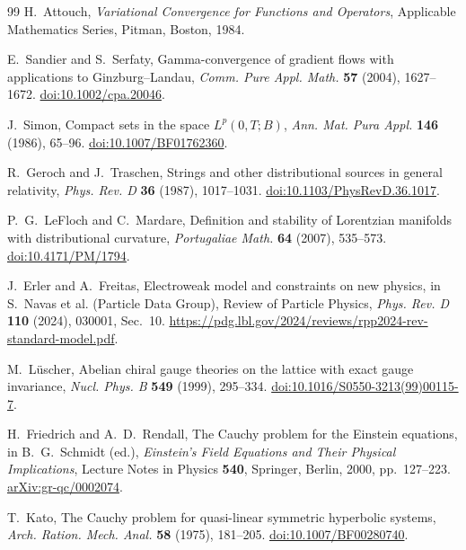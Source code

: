 \documentclass[11pt]{article}
\numberwithin{equation}{section}
\theoremstyle{definition}
\theoremstyle{remark}
\begin{document}
\begin{thebibliography}{99}
H.~Attouch,
\emph{Variational Convergence for Functions and Operators},
Applicable Mathematics Series, Pitman, Boston, 1984.

E.~Sandier and S.~Serfaty,
Gamma-convergence of gradient flows with applications to Ginzburg--Landau,
\emph{Comm. Pure Appl. Math.} \textbf{57} (2004), 1627--1672.
\href{https://doi.org/10.1002/cpa.20046}{doi:10.1002/cpa.20046}.

J.~Simon,
Compact sets in the space $L^p(0,T;B)$,
\emph{Ann. Mat. Pura Appl.} \textbf{146} (1986), 65--96.
\href{https://doi.org/10.1007/BF01762360}{doi:10.1007/BF01762360}.

R.~Geroch and J.~Traschen,
Strings and other distributional sources in general relativity,
\emph{Phys. Rev. D} \textbf{36} (1987), 1017--1031.
\href{https://doi.org/10.1103/PhysRevD.36.1017}{doi:10.1103/PhysRevD.36.1017}.

P.~G.~LeFloch and C.~Mardare,
Definition and stability of Lorentzian manifolds with distributional curvature,
\emph{Portugaliae Math.} \textbf{64} (2007), 535--573.
\href{https://doi.org/10.4171/PM/1794}{doi:10.4171/PM/1794}.

J.~Erler and A.~Freitas,
Electroweak model and constraints on new physics,
in S.~Navas et al. (Particle Data Group), Review of Particle Physics,
\emph{Phys. Rev. D} \textbf{110} (2024), 030001, Sec.~10.
\url{https://pdg.lbl.gov/2024/reviews/rpp2024-rev-standard-model.pdf}.

M.~L\"uscher,
Abelian chiral gauge theories on the lattice with exact gauge invariance,
\emph{Nucl. Phys. B} \textbf{549} (1999), 295--334.
\href{https://doi.org/10.1016/S0550-3213(99)00115-7}{doi:10.1016/S0550-3213(99)00115-7}.

H.~Friedrich and A.~D.~Rendall,
The Cauchy problem for the Einstein equations,
in B.~G.~Schmidt (ed.), \emph{Einstein's Field Equations and Their Physical Implications},
Lecture Notes in Physics \textbf{540}, Springer, Berlin, 2000, pp.~127--223.
\href{https://arxiv.org/abs/gr-qc/0002074}{arXiv:gr-qc/0002074}.

T.~Kato,
The Cauchy problem for quasi-linear symmetric hyperbolic systems,
\emph{Arch. Ration. Mech. Anal.} \textbf{58} (1975), 181--205.
\href{https://doi.org/10.1007/BF00280740}{doi:10.1007/BF00280740}.


\end{thebibliography}
\end{document}
